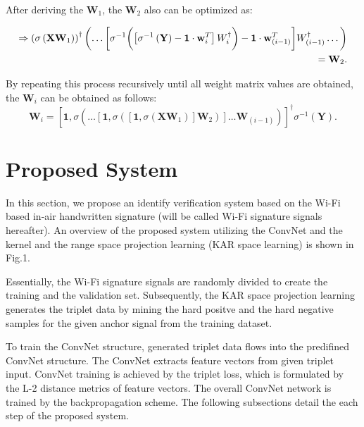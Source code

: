 \documentclass[runningheads]{llncs}
\begin{document}
After deriving the $\mathbf{W}_{1}$, the $\mathbf{W}_{2}$ also can be optimized as:

\begin{equation}
    \begin{aligned}
        \Rightarrow
        \left(\sigma\left(\mathbf{X}\mathbf{W}_{1}\right)\right)^{\dagger}
        \biggl(\dots
        \biggl[\sigma^{-1}\biggl(
            \left[\sigma^{-1}\left(\mathbf{Y}\right)-\mathbf{1}\cdot\mathbf{w}_{i}^{T}\right]\mathnormal{W}_{i}^\dagger
        \biggr)
        - \mathbf{1}\cdot\mathbf{w}_{(i-1)}^{T}\biggr]\mathnormal{W}_{(i-1)}^{\dagger}
        \dots\biggr)\\
        = \mathbf{W}_{2} .
    \end{aligned}
\end{equation}

By repeating this process recursively until all weight matrix values are obtained, the $\mathbf{W}_{i}$ can be obtained as follows:
\begin{equation}
    \mathbf{W}_{i} = \left[\mathbf{1},\sigma\left(\dots\left[\mathbf{1},\sigma\left(\left[\mathbf{1},\sigma\left(\mathbf{X}\mathbf{W}_{1}\right)\right]\mathbf{W}_{2}\right)\right]\dots\mathbf{W}_{(i-1)}\right)\right]^{\dagger}\sigma^{-1}\left(\mathbf{Y}\right).
\end{equation}


\section{Proposed System}

In this section, we propose an identify verification system based on the Wi-Fi based in-air handwritten signature (will be called Wi-Fi signature signals hereafter). An overview of the proposed system utilizing the ConvNet \cite{lecun1998gradient} and the kernel and the range space projection learning (KAR space learning) \cite{toh2018learning,toh2018gradient} is shown in Fig.1.

Essentially, the Wi-Fi signature signals are randomly divided to create the training and the validation set. Subsequently, the KAR space projection learning generates the triplet data by mining the hard positve and the hard negative samples for the given anchor signal from the training dataset.

To train the ConvNet structure, generated triplet data flows into the predifined ConvNet structure. The ConvNet extracts feature vectors from given triplet input.
ConvNet training is achieved by the triplet loss, which is formulated by the L-2 distance metrics of feature vectors. The overall ConvNet network is trained by the backpropagation scheme. The following subsections detail the each step of the proposed system.
\end{document}
